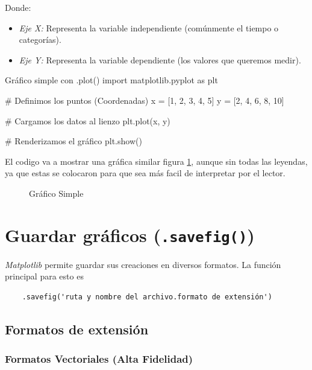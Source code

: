 Donde:
\begin{itemize}
\item \textit{Eje X:} Representa la variable independiente (comúnmente el tiempo o categorías).
\item \textit{Eje Y:} Representa la variable dependiente (los valores que queremos medir).
\end{itemize}

\begin{pycode}{Gráfico simple con .plot()}
import matplotlib.pyplot as plt

# Definimos los puntos (Coordenadas)
x = [1, 2, 3, 4, 5]
y = [2, 4, 6, 8, 10]

# Cargamos los datos al lienzo
plt.plot(x, y)

# Renderizamos el gráfico
plt.show()
\end{pycode}

El codigo va a mostrar una gráfica similar figura \ref{fig:grafico_simple_1}, aunque sin todas las leyendas, ya que estas se colocaron para que sea más facil de interpretar por el lector.

\begin{figure}[ht]
    \centering
    
    \caption{Gráfico Simple}
    \label{fig:grafico_simple_1}
\end{figure}




\section{Guardar gráficos (\texttt{.savefig()})}

\textit{Matplotlib} permite guardar sus creaciones en diversos formatos. La función principal para esto es 
\begin{verbatim}
    .savefig('ruta y nombre del archivo.formato de extensión')
\end{verbatim}

\subsection{Formatos de extensión}

\subsubsection{Formatos Vectoriales (Alta Fidelidad)}

